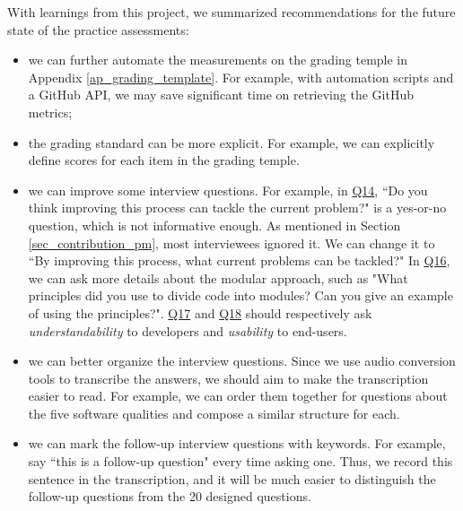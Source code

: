 With learnings from this project, we summarized recommendations for the future state of the practice assessments:
\begin{itemize}
	\item we can further automate the measurements on the grading temple in Appendix \ref{ap_grading_template}. For example, with automation scripts and a GitHub API, we may save significant time on retrieving the GitHub metrics;
	\item the grading standard can be more explicit. For example, we can explicitly define scores for each item in the grading temple.
	\item we can improve some interview questions. For example, in \hyperlink{q14}{Q14}, ``Do you think improving this process can tackle the current problem?" is a yes-or-no question, which is not informative enough. As mentioned in Section \ref{sec_contribution_pm}, most interviewees ignored it. We can change it to ``By improving this process, what current problems can be tackled?" In \hyperlink{q16}{Q16}, we can ask more details about the modular approach, such as "What principles did you use to divide code into modules? Can you give an example of using the principles?". \hyperlink{q17}{Q17} and  \hyperlink{q18}{Q18} should respectively ask \textit{understandability} to developers and \textit{usability} to end-users.
	\item we can better organize the interview questions. Since we use audio conversion tools to transcribe the answers, we should aim to make the transcription easier to read. For example, we can order them together for questions about the five software qualities and compose a similar structure for each.
	\item we can mark the follow-up interview questions with keywords. For example, say ``this is a follow-up question" every time asking one. Thus, we record this sentence in the transcription, and it will be much easier to distinguish the follow-up questions from the 20 designed questions.
\end{itemize}
